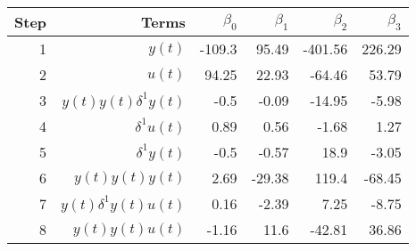 \begin{tabular}{rrrrrr}
Step & Terms & $\beta_{0}$ & $\beta_{1}$ & $\beta_{2}$ & $\beta_{3}$ \\ 
\hline 
1 & $y(t)$ & -109.3 & 95.49 & -401.56 & 226.29 \\ 
2 & $u(t)$ & 94.25 & 22.93 & -64.46 & 53.79 \\ 
3 & $y(t)y(t)\delta^1 y(t)$ & -0.5 & -0.09 & -14.95 & -5.98 \\ 
4 & $\delta^1 u(t)$ & 0.89 & 0.56 & -1.68 & 1.27 \\ 
5 & $\delta^1 y(t)$ & -0.5 & -0.57 & 18.9 & -3.05 \\ 
6 & $y(t)y(t)y(t)$ & 2.69 & -29.38 & 119.4 & -68.45 \\ 
7 & $y(t)\delta^1 y(t)u(t)$ & 0.16 & -2.39 & 7.25 & -8.75 \\ 
8 & $y(t)y(t)u(t)$ & -1.16 & 11.6 & -42.81 & 36.86 \\ 
\hline 
\end{tabular}